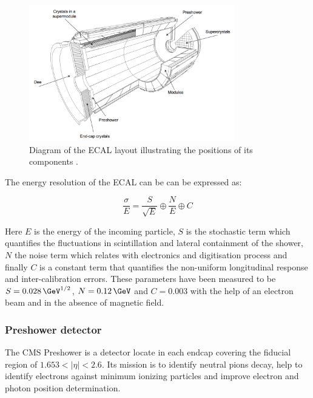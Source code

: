 \begin{figure}[!htb]
  \centering
  \includegraphics[width=0.8\textwidth]{Chapter02/CMS/Images/CMS_ECAL_Layout.png}
  \caption{Diagram of the ECAL layout illustrating the positions of its components \cite{ARTICLE:TheCMSExperiment}.}
  \label{FIGURE:ExperimentalApparatus_CMS_ECAL_Layout}
\end{figure}
 
The energy resolution of the \gls{ECAL} can be can be expressed as: 

\begin{equation}
\frac{\sigma}{E} = \frac{S}{\sqrt{E}} \oplus \frac{N}{E} \oplus C
\end{equation}

Here $E$ is the energy of the incoming particle, $S$ is the stochastic term which quantifies the fluctuations in scintillation and lateral containment of the shower, $N$ the noise term which relates with electronics and digitisation process and finally $C$ is a constant term that quantifies the non-uniform longitudinal response and inter-calibration errors. These parameters have been measured to be  $S=0.028\,\GeV^{1/2}$, $N=0.12\,\GeV$ and $C=0.003$ with the help of an electron beam \cite{ARTICLE:CMSECALTestBeam} and in the absence of magnetic field.

\subsubsection{Preshower detector}
\label{SUBSUBSECTION:ExperimentalApparatus_CMS_ECAL_Preshower}

The \gls{CMS} Preshower is a detector locate in each endcap covering the fiducial region of $1.653<|\eta|<2.6$. Its mission is to identify neutral pions decay, help to identify electrons against minimum ionizing particles and improve electron and photon position determination.

